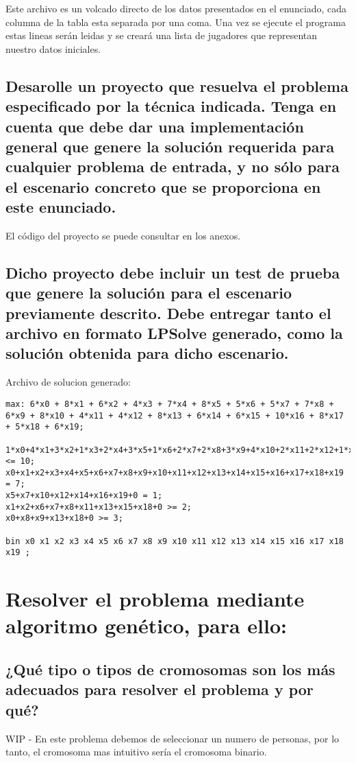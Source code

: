 \documentclass[a4paper,12pt]{article}
\begin{document}
Este archivo es un volcado directo de los datos presentados en el enunciado, cada columna de la tabla esta separada por una coma.
Una vez se ejecute el programa estas lineas serán leidas y se creará una lista de jugadores que representan nuestro datos iniciales.
\subsection{Desarolle un proyecto que resuelva el problema especificado por la técnica indicada.
Tenga en cuenta que debe dar una implementación general que genere la solución requerida para
cualquier problema de entrada, y no sólo para el escenario concreto que se proporciona en este enunciado.}
El código del proyecto se puede consultar en los anexos.

\subsection{Dicho proyecto debe incluir un test de prueba que genere la solución para el escenario previamente descrito.
Debe entregar tanto el archivo en formato LPSolve generado, como la solución obtenida para dicho escenario.}

Archivo de solucion generado:

\begin{lstlisting}
max: 6*x0 + 8*x1 + 6*x2 + 4*x3 + 7*x4 + 8*x5 + 5*x6 + 5*x7 + 7*x8 + 6*x9 + 8*x10 + 4*x11 + 4*x12 + 8*x13 + 6*x14 + 6*x15 + 10*x16 + 8*x17 + 5*x18 + 6*x19;

1*x0+4*x1+3*x2+1*x3+2*x4+3*x5+1*x6+2*x7+2*x8+3*x9+4*x10+2*x11+2*x12+1*x13+3*x14+4*x15+5*x16+1*x17+2*x18+3*x19 <= 10;
x0+x1+x2+x3+x4+x5+x6+x7+x8+x9+x10+x11+x12+x13+x14+x15+x16+x17+x18+x19 = 7;
x5+x7+x10+x12+x14+x16+x19+0 = 1;
x1+x2+x6+x7+x8+x11+x13+x15+x18+0 >= 2;
x0+x8+x9+x13+x18+0 >= 3;

bin x0 x1 x2 x3 x4 x5 x6 x7 x8 x9 x10 x11 x12 x13 x14 x15 x16 x17 x18 x19 ;
\end{lstlisting}



\section{Resolver el problema mediante algoritmo genético, para ello:}
\subsection{¿Qué tipo o tipos de cromosomas son los más adecuados para resolver el problema y por qué?}
WIP - En este problema debemos de seleccionar un numero de personas, por lo tanto, el cromosoma mas intuitivo sería el cromosoma binario.
\end{document}
